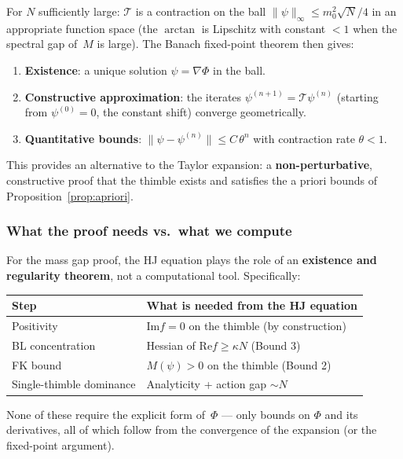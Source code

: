 \documentclass[12pt]{article}
\theoremstyle{definition}
\theoremstyle{remark}
\newcommand{\im}{\mathrm{Im}}
\newcommand{\re}{\mathrm{Re}}
\begin{document}
For $N$ sufficiently large: $\mathcal{T}$ is a contraction on the
ball $\|\psi\|_\infty \le m_0^2\sqrt{N}/4$ in an appropriate
function space (the $\arctan$ is Lipschitz with constant $< 1$
when the spectral gap of~$M$ is large). The Banach fixed-point
theorem then gives:
\begin{enumerate}
\item \textbf{Existence}: a unique solution $\psi = \nabla\Phi$
  in the ball.
\item \textbf{Constructive approximation}: the iterates
  $\psi^{(n+1)} = \mathcal{T}\psi^{(n)}$ (starting from
  $\psi^{(0)} = 0$, the constant shift) converge geometrically.
\item \textbf{Quantitative bounds}: $\|\psi - \psi^{(n)}\| \le
  C\,\theta^n$ with contraction rate $\theta < 1$.
\end{enumerate}

This provides an alternative to the Taylor expansion:
a \textbf{non-perturbative}, constructive proof that the thimble
exists and satisfies the a priori bounds of
Proposition~\ref{prop:apriori}.

\subsubsection{What the proof needs vs.\ what we compute}

For the mass gap proof, the HJ equation plays the role of an
\textbf{existence and regularity theorem}, not a computational
tool. Specifically:

\begin{center}
\begin{tabular}{|l|l|}
\hline
\textbf{Step} & \textbf{What is needed from the HJ equation} \\
\hline
Positivity & $\im f = 0$ on the thimble (by construction) \\
BL concentration & Hessian of $\re f \ge \kappa N$ (Bound 3) \\
FK bound & $M(\psi) > 0$ on the thimble (Bound 2) \\
Single-thimble dominance & Analyticity + action gap $\sim N$ \\
\hline
\end{tabular}
\end{center}

None of these require the explicit form of~$\Phi$ --- only
bounds on $\Phi$ and its derivatives, all of which follow from
the convergence of the expansion (or the fixed-point argument).
\end{document}
